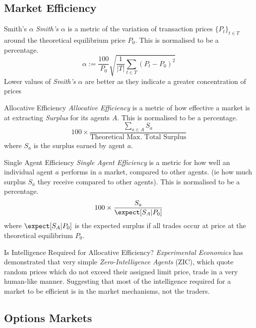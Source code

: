 \documentclass[11pt,a4paper]{article}
\begin{document}
\subsection*{Market Efficiency}

  \begin{definition}{Smith's $\alpha$}
    \textit{Smith's $\alpha$} is a metric of the variation of transaction prices $\{P_t\}_{t\in T}$ around the theoretical equilibrium price $P_0$. This is normalised to be a percentage.
    \[ \alpha:=\frac{100}{P_0}\sqrt{\frac1{|T|}\sum_{t\in T}(P_t-P_0)^2} \]
    Lower values of \textit{Smith's $\alpha$} are better as they indicate a greater concentration of prices
  \end{definition}

  \begin{definition}{Allocative Efficiency}
    \textit{Allocative Efficiency} is a metric of how effective a market is at extracting \textit{Surplus} for its agents $A$. This is normalised to be a percentage.
    \[ 100\times\frac{\sum_{a\in A}S_a}{\text{Theoretical Max. Total Surplus}} \]
    where $S_a$ is the surplus earned by agent $a$.
  \end{definition}

  \begin{definition}{Single Agent Efficiency}
    \textit{Single Agent Efficiency} is a metric for how well an individual agent $a$ performs in a market, compared to other agents. (ie how much surplus $S_a$ they receive compared to other agents). This is normalised to be a percentage.
    \[ 100\times\frac{S_a}{\expect[S_A|P_0]} \]
    where $\expect[S_A|P_0]$ is the expected surplus if all trades occur at price at the theoretical equilibrium $P_0$.
  \end{definition}

  \begin{remark}{Is Intelligence Required for Allocative Efficiency?}
    \textit{Experimental Economics} has demonstrated that very simple \textit{Zero-Intelligence Agents} (ZIC), which quote random prices which do not exceed their assigned limit price, trade in a very human-like manner. Suggesting that most of the intelligence required for a market to be efficient is in the market mechanisms, not the traders.
  \end{remark}

\subsection{Options Markets} \label{sec_OptionsMarkets}
\end{document}
